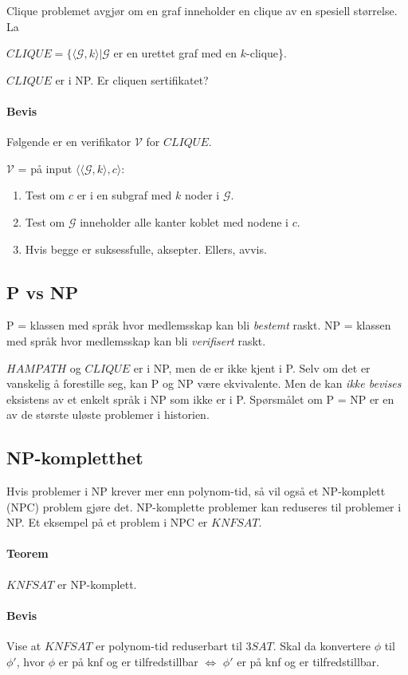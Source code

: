 \documentclass[11pt,a4paper]{article}
\begin{document}
Clique problemet avgjør om en graf inneholder en clique av en spesiell størrelse. La
\begin{center}
$CLIQUE = \{\langle \mathcal{G},k \rangle | \mathcal{G}$ er en urettet graf med en $k$-clique\}.
\end{center}

$CLIQUE$ er i NP. Er cliquen sertifikatet?

\paragraph{Bevis} Følgende er en verifikator $\mathcal{V}$ for $CLIQUE$.

$\mathcal{V}$ = på input $\langle \langle \mathcal{G},k \rangle,c\rangle$:
\begin{enumerate}
\item{Test om $c$ er i en subgraf med $k$ noder i $\mathcal{G}$.}
\item{Test om $\mathcal{G}$ inneholder alle kanter koblet med nodene i $c$.}
\item{Hvis begge er suksessfulle, aksepter. Ellers, avvis.}
\end{enumerate}

\subsection{P vs NP}
P = klassen med språk hvor medlemsskap kan bli \textit{bestemt} raskt. NP = klassen med språk hvor medlemsskap kan bli \textit{verifisert} raskt.

$HAMPATH$ og $CLIQUE$ er i NP, men de er ikke kjent i P. Selv om det er vanskelig å forestille seg, kan P og NP være ekvivalente. Men de kan \textit{ikke bevises} eksistens av et enkelt språk i NP som ikke er i P. Spørsmålet om P = NP er en av de største uløste problemer i historien.

\subsection{NP-kompletthet}
Hvis problemer i NP krever mer enn polynom-tid, så vil også et NP-komplett (NPC) problem gjøre det. NP-komplette problemer kan reduseres til problemer i NP. Et eksempel på et problem i NPC er $KNFSAT$.

\paragraph{Teorem} $KNFSAT$ er NP-komplett.
\paragraph{Bevis} Vise at $KNFSAT$ er polynom-tid reduserbart til $3SAT$. Skal da konvertere $\phi$ til $\phi'$, hvor $\phi$ er på knf og er tilfredstillbar $\Leftrightarrow$ $\phi'$ er på knf og er tilfredstillbar.
\end{document}
